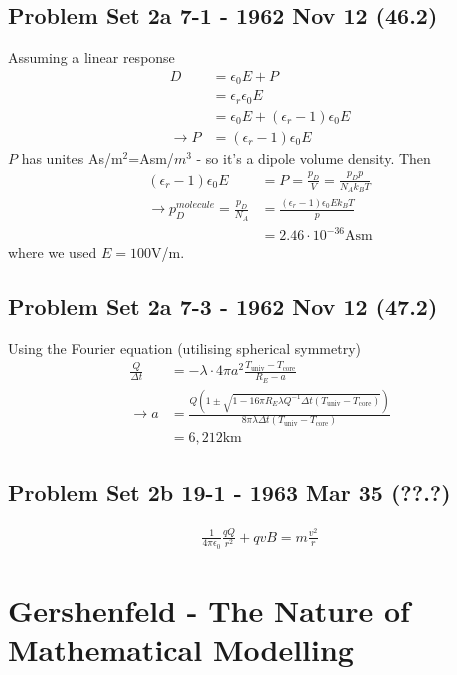 \documentclass[../main.tex]{subfiles}
\begin{document}
\subsection{Problem Set 2a  7-1 - 1962 Nov 12 (46.2)}
Assuming a linear response
\begin{align}
D&=\epsilon_0E+P\\
&=\epsilon_r\epsilon_0E\\
&=\epsilon_0E+(\epsilon_r-1)\epsilon_0E\\
\rightarrow P&=(\epsilon_r-1)\epsilon_0E
\end{align}
$P$ has unites As/m$^2$=Asm/$m^3$ - so it's a dipole volume density. Then
\begin{align}
(\epsilon_r-1)\epsilon_0E&=P=\frac{p_D}{V}=\frac{p_Dp}{N_Ak_BT}\\
\rightarrow p_D^{molecule}=\frac{p_D}{N_A}&=\frac{(\epsilon_r-1)\epsilon_0Ek_BT}{p}\\
&=2.46\cdot10^{-36}\text{Asm}
\end{align}
where we used $E=100$V/m.


\subsection{Problem Set 2a  7-3 - 1962 Nov 12 (47.2)}
Using the Fourier equation (utilising spherical symmetry)
\begin{align}
\frac{Q}{\Delta t}
&=-\lambda\cdot 4\pi a^2\frac{T_\text{univ}-T_\text{core}}{R_E-a}\\
\rightarrow a
&=\frac{Q\left(1\pm\sqrt{1-16\pi R_E\lambda Q^{-1}\Delta t(T_\text{univ}-T_\text{core})}\right)}{8\pi\lambda\Delta t(T_\text{univ}-T_\text{core})}\\
&=6,212\text{km}
\end{align}


\subsection{Problem Set 2b  19-1 - 1963 Mar 35 (??.?)}
\begin{align}
\frac{1}{4\pi\epsilon_0}\frac{qQ}{r^2}+qvB=m\frac{v^2}{r}
\end{align}

\section{{\sc Gershenfeld} - The Nature of Mathematical Modelling}
\end{document}
